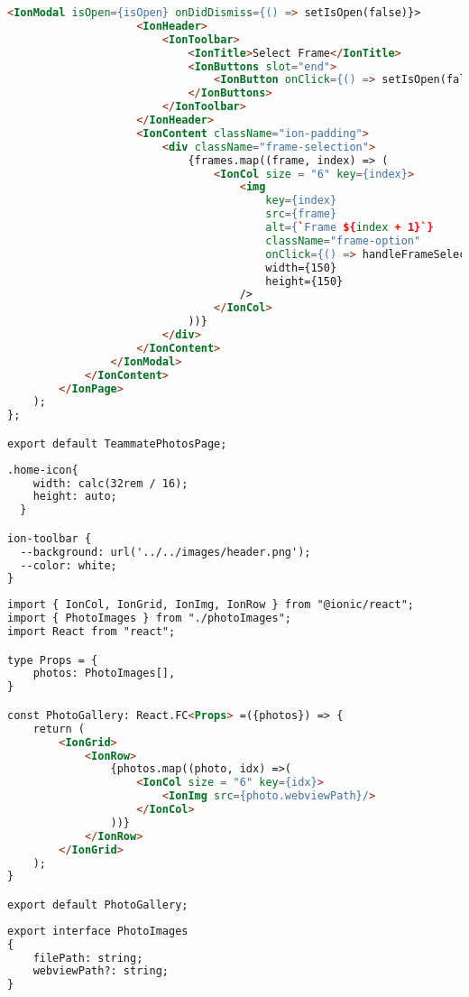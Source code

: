 \begin{lstlisting}[language=HTML, caption=teammate\_photos.tsx]
                <IonModal isOpen={isOpen} onDidDismiss={() => setIsOpen(false)}>
                    <IonHeader>
                        <IonToolbar>
                            <IonTitle>Select Frame</IonTitle>
                            <IonButtons slot="end">
                                <IonButton onClick={() => setIsOpen(false)}>CANCEL</IonButton>
                            </IonButtons>
                        </IonToolbar>
                    </IonHeader>
                    <IonContent className="ion-padding">
                        <div className="frame-selection">
                            {frames.map((frame, index) => (
                                <IonCol size = "6" key={index}>
                                    <img
                                        key={index}
                                        src={frame}
                                        alt={`Frame ${index + 1}`}
                                        className="frame-option"
                                        onClick={() => handleFrameSelection(frame)}
                                        width={150}
                                        height={150}
                                    />
                                </IonCol>
                            ))}
                        </div>
                    </IonContent>
                </IonModal>
            </IonContent>
        </IonPage>
    );
};

export default TeammatePhotosPage;
\end{lstlisting}

\begin{lstlisting}[language=HTML, caption=teammate\_photos.css]
.home-icon{
    width: calc(32rem / 16);
    height: auto;
  }

ion-toolbar {
  --background: url('../../images/header.png');
  --color: white;
}
\end{lstlisting}

\begin{lstlisting}[language=HTML, caption=photoGallery.tsx]
import { IonCol, IonGrid, IonImg, IonRow } from "@ionic/react";
import { PhotoImages } from "./photoImages";
import React from "react";

type Props = {
    photos: PhotoImages[],
}

const PhotoGallery: React.FC<Props> =({photos}) => {
    return (
        <IonGrid>
            <IonRow>
                {photos.map((photo, idx) =>(
                    <IonCol size = "6" key={idx}>
                        <IonImg src={photo.webviewPath}/>
                    </IonCol>
                ))}
            </IonRow>
        </IonGrid>
    );
}

export default PhotoGallery;
\end{lstlisting}

\begin{lstlisting}[language=HTML, caption=photoImages.tsx]
export interface PhotoImages
{
    filePath: string;
    webviewPath?: string;
}
\end{lstlisting}

%  

